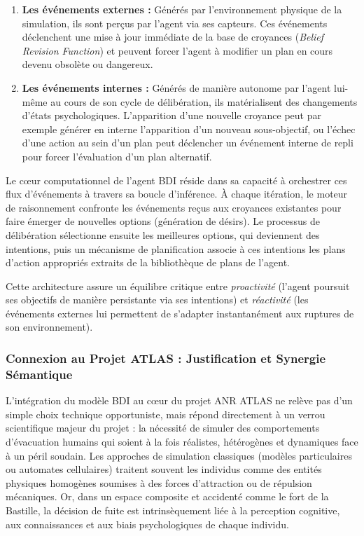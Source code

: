 \documentclass{article}
\begin{document}
\begin{enumerate}
    \item \textbf{Les événements externes :} Générés par l'environnement physique de la simulation, ils sont perçus par l'agent via ses capteurs. Ces événements déclenchent une mise à jour immédiate de la base de croyances (\textit{Belief Revision Function}) et peuvent forcer l'agent à modifier un plan en cours devenu obsolète ou dangereux.
    \item \textbf{Les événements internes :} Générés de manière autonome par l'agent lui-même au cours de son cycle de délibération, ils matérialisent des changements d'états psychologiques. L'apparition d'une nouvelle croyance peut par exemple générer en interne l'apparition d'un nouveau sous-objectif, ou l'échec d'une action au sein d'un plan peut déclencher un événement interne de repli pour forcer l'évaluation d'un plan alternatif.
\end{enumerate}

Le cœur computationnel de l'agent BDI réside dans sa capacité à orchestrer ces flux d'événements à travers sa boucle d'inférence. À chaque itération, le moteur de raisonnement confronte les événements reçus aux croyances existantes pour faire émerger de nouvelles options (génération de désirs). Le processus de délibération sélectionne ensuite les meilleures options, qui deviennent des intentions, puis un mécanisme de planification associe à ces intentions les plans d'action appropriés extraits de la bibliothèque de plans de l'agent. 

Cette architecture assure un équilibre critique entre \textit{proactivité} (l'agent poursuit ses objectifs de manière persistante via ses intentions) et \textit{réactivité} (les événements externes lui permettent de s'adapter instantanément aux ruptures de son environnement).
\subsubsection{Connexion au Projet ATLAS : Justification et Synergie Sémantique}

L'intégration du modèle BDI au cœur du projet ANR ATLAS ne relève pas d'un simple choix technique opportuniste, mais répond directement à un verrou scientifique majeur du projet : la nécessité de simuler des comportements d'évacuation humains qui soient à la fois réalistes, hétérogènes et dynamiques face à un péril soudain. Les approches de simulation classiques (modèles particulaires ou automates cellulaires) traitent souvent les individus comme des entités physiques homogènes soumises à des forces d'attraction ou de répulsion mécaniques. Or, dans un espace composite et accidenté comme le fort de la Bastille, la décision de fuite est intrinsèquement liée à la perception cognitive, aux connaissances et aux biais psychologiques de chaque individu.
\end{document}
